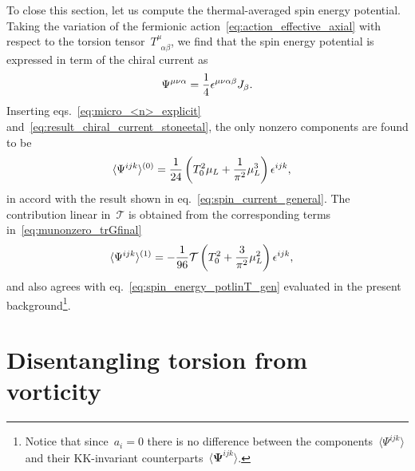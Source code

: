 \documentclass[11pt,a4paper]{article}
\begin{document}
To close this section, 
let us compute the thermal-averaged spin energy potential. 
Taking the variation of the fermionic action~\eqref{eq:action_effective_axial} with
respect to the torsion tensor~$T^{\mu}_{\,\,\,\alpha\beta}$, 
we find that the spin energy potential is expressed 
in term of the chiral current as
\begin{align}
\Psi^{\mu\nu\alpha}={1\over 4}\epsilon^{\mu\nu\alpha\beta}J_{\beta}.
\end{align} 
Inserting eqs.~\eqref{eq:micro_<n>_explicit} and~\eqref{eq:result_chiral_current_stoneetal}, 
the only nonzero components are found to be
\begin{align}
\langle\Psi^{ijk}\rangle^{(0)}
&={1\over 24}\left(T_{0}^{2}\mu_{L}+{1\over \pi^{2}}\mu_{L}^{3}\right)\epsilon^{ijk},
\end{align}
in accord with the result shown in eq.~\eqref{eq:spin_current_general}. 
The contribution
linear in~$\mathcal{T}$ is obtained from the corresponding terms in~\eqref{eq:munonzero_trGfinal}
\begin{align}
\langle\Psi^{ijk}\rangle^{(1)}
&=-{1\over 96}\mathcal{T}\left(T_{0}^{2}+{3\over \pi^{2}}\mu_{L}^{2}\right)\epsilon^{ijk},
\end{align} 
and also agrees with eq.~\eqref{eq:spin_energy_potlinT_gen}
evaluated in the present background\footnote{Notice that since~$a_{i}=0$ there is no difference
between the components~$\langle\Psi^{ijk}\rangle$ and 
their KK-invariant counterparts~$\langle\boldsymbol{\Psi}^{ijk}
\rangle$.}. 

\section{Disentangling torsion from vorticity}
\label{sec:T0ij}
\end{document}
